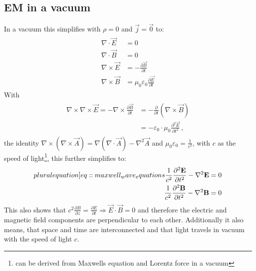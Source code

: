 \subsection{EM in a vacuum}
% 
In a vacuum this simplifies with $\rho = 0$ and $\vec{j} = \vec{0}$ to:
% 
\begin{align}
\begin{split} \label{eq::maxwell_vacuum}
  \nabla \cdot \vec{E} &= 0 \quad\\
  \nabla \cdot \vec{B} &= 0 \quad\\
  \nabla \times \vec{E} &= -\frac{\partial\vec B}{\partial t}\\
  \nabla \times \vec{B} &= \mu_0\varepsilon_0 \frac{\partial\vec E}{\partial t}
  \end{split}
\end{align}
% 
With 
\begin{align}
\begin{split} 
    \nabla \times \nabla \times \vec{E} = -\nabla \times \frac{\partial \vec{B}} {\partial t} &= -\frac{\partial} {\partial t} \left( \nabla \times  \vec{B} \right)\\
    &= -\varepsilon_0 \cdot \mu_0 \frac{\partial^2 \vec{E}}{\partial t^2} \, ,
\end{split}
\end{align}
% 
the identity $\nabla \times \left( \nabla \times \vec{A} \right) = \nabla(\nabla \cdot \vec{A}) - \nabla^{2}\vec{A}$ and $\mu_0\varepsilon_0 = \frac{1}{c^2}$, with $c$ as the speed of light\footnote{can be derived from Maxwells equation and Lorentz force in a vacuum}, this further simplifies to:
% 
\begin{align}
\begin{split} \label[pluralequation]{eq::maxwell_wave_equations}
  \frac{1}{c^2} \frac{\partial^2 \vec{E}}{\partial t^2} - \nabla^2 \vec{E} &= 0 \\
  \frac{1}{c^2} \frac{\partial^2 \vec{B}}{\partial t^2} - \nabla^2 \vec{B} &= 0
\end{split}
\end{align}
% 
% 
% 
This also shows that $c^2  \frac{\partial B} {\partial z} = \frac{\partial E}{\partial t} \Rightarrow \vec{E} \cdot \vec{B} = 0$ and therefore the electric and magnetic field components are perpendicular to each other.
Additionally it also means, that space and time are interconnected and that light travels in vacuum with the speed of light $c$.
% 
